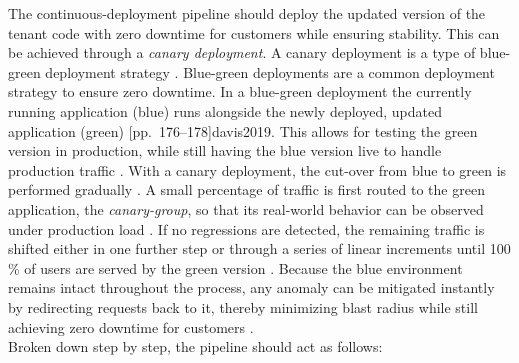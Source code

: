 \documentclass[11pt, a4paper, oneside, listof=totoc]{scrartcl}
\begin{document}
                    The continuous-deployment pipeline should deploy the updated version of the
                    tenant code with zero downtime for customers while ensuring stability.
                    This can be achieved through a \textit{canary deployment}.
                    A canary deployment is a type of blue-green deployment strategy
                    \parencite[pp.~33--34]{awsOverviewDeploymentOptions}.
                    Blue-green deployments are a common deployment strategy to ensure zero downtime.
                    In a blue-green deployment the currently running application (blue) runs
                    alongside the newly deployed, updated application (green)
                    \parencite[pp.~32--33]{awsOverviewDeploymentOptions}[pp.~176--178]{davis2019}.
                    This allows for testing the green version in production, while still having the
                    blue version live to handle production traffic
                    \parencite[pp.~176--178]{davis2019}.
                    With a canary deployment, the cut-over from blue to green is performed
                    gradually \parencite[pp.~33--34]{awsOverviewDeploymentOptions}.
                    A small percentage of traffic is first routed to the green application,
                    the \textit{canary-group}, so that its real-world behavior can be observed under
                    production load \parencite[pp.~33--34]{awsOverviewDeploymentOptions}.
                    If no regressions are detected, the remaining traffic is shifted either in one
                    further step or through a series of linear increments until 100 \% of users are
                    served by the green version
                    \parencite[pp.~33--34]{awsOverviewDeploymentOptions}.
                    Because the blue environment remains intact throughout the process, any anomaly
                    can be mitigated instantly by redirecting requests back to it, thereby
                    minimizing blast radius while still achieving zero downtime for customers
                    \parencite[pp.~33--34]{awsOverviewDeploymentOptions}.
                    \\
                    Broken down step by step, the pipeline should act as follows:
                    
\end{document}
